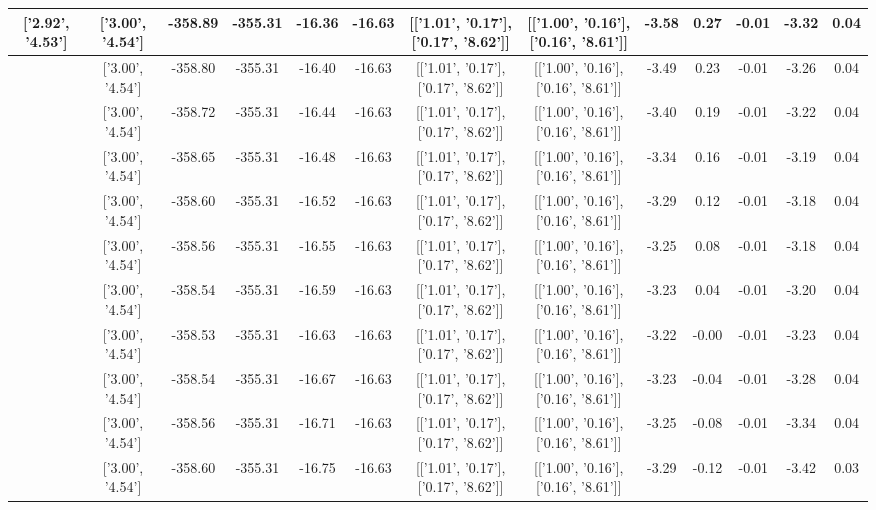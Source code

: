\begin{table}[htbp]
\begin{adjustbox}{angle=90}
\begin{tabular}{|c|c|c|c|c|c|c|c|c|c|c|c|c|}
 ['2.92', '4.53'] & ['3.00', '4.54'] & -358.89 & -355.31 & -16.36 & -16.63 & [['1.01', '0.17'], ['0.17', '8.62']] & [['1.00', '0.16'], ['0.16', '8.61']] & -3.58 & 0.27 & -0.01 & -3.32 & 0.04\\ \hline
 ['2.93', '4.53'] & ['3.00', '4.54'] & -358.80 & -355.31 & -16.40 & -16.63 & [['1.01', '0.17'], ['0.17', '8.62']] & [['1.00', '0.16'], ['0.16', '8.61']] & -3.49 & 0.23 & -0.01 & -3.26 & 0.04\\ \hline
 ['2.94', '4.53'] & ['3.00', '4.54'] & -358.72 & -355.31 & -16.44 & -16.63 & [['1.01', '0.17'], ['0.17', '8.62']] & [['1.00', '0.16'], ['0.16', '8.61']] & -3.40 & 0.19 & -0.01 & -3.22 & 0.04\\ \hline
 ['2.95', '4.54'] & ['3.00', '4.54'] & -358.65 & -355.31 & -16.48 & -16.63 & [['1.01', '0.17'], ['0.17', '8.62']] & [['1.00', '0.16'], ['0.16', '8.61']] & -3.34 & 0.16 & -0.01 & -3.19 & 0.04\\ \hline
 ['2.96', '4.54'] & ['3.00', '4.54'] & -358.60 & -355.31 & -16.52 & -16.63 & [['1.01', '0.17'], ['0.17', '8.62']] & [['1.00', '0.16'], ['0.16', '8.61']] & -3.29 & 0.12 & -0.01 & -3.18 & 0.04\\ \hline
 ['2.98', '4.54'] & ['3.00', '4.54'] & -358.56 & -355.31 & -16.55 & -16.63 & [['1.01', '0.17'], ['0.17', '8.62']] & [['1.00', '0.16'], ['0.16', '8.61']] & -3.25 & 0.08 & -0.01 & -3.18 & 0.04\\ \hline
 ['2.99', '4.54'] & ['3.00', '4.54'] & -358.54 & -355.31 & -16.59 & -16.63 & [['1.01', '0.17'], ['0.17', '8.62']] & [['1.00', '0.16'], ['0.16', '8.61']] & -3.23 & 0.04 & -0.01 & -3.20 & 0.04\\ \hline
 ['3.00', '4.54'] & ['3.00', '4.54'] & -358.53 & -355.31 & -16.63 & -16.63 & [['1.01', '0.17'], ['0.17', '8.62']] & [['1.00', '0.16'], ['0.16', '8.61']] & -3.22 & -0.00 & -0.01 & -3.23 & 0.04\\ \hline
 ['3.01', '4.54'] & ['3.00', '4.54'] & -358.54 & -355.31 & -16.67 & -16.63 & [['1.01', '0.17'], ['0.17', '8.62']] & [['1.00', '0.16'], ['0.16', '8.61']] & -3.23 & -0.04 & -0.01 & -3.28 & 0.04\\ \hline
 ['3.02', '4.54'] & ['3.00', '4.54'] & -358.56 & -355.31 & -16.71 & -16.63 & [['1.01', '0.17'], ['0.17', '8.62']] & [['1.00', '0.16'], ['0.16', '8.61']] & -3.25 & -0.08 & -0.01 & -3.34 & 0.04\\ \hline
 ['3.04', '4.54'] & ['3.00', '4.54'] & -358.60 & -355.31 & -16.75 & -16.63 & [['1.01', '0.17'], ['0.17', '8.62']] & [['1.00', '0.16'], ['0.16', '8.61']] & -3.29 & -0.12 & -0.01 & -3.42 & 0.03\\ \hline

\end{tabular}
\end{adjustbox}
\end{table}
